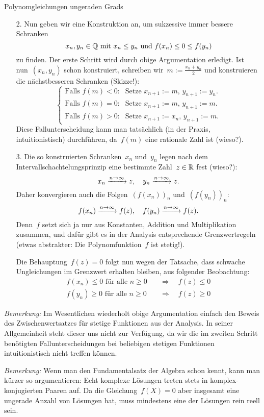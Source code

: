 \documentclass{algblatt}
\begin{document}
\begin{aufgabe}{Polynomgleichungen ungeraden Grads}
\begin{loesung}
\begin{enumerate}
\item[2.] Nun geben wir eine Konstruktion an, um sukzessive immer bessere
Schranken
\[ x_n, y_n \in \mathbb{Q} \text{ mit } x_n \leq y_n \text{ und } f(x_n) \leq 0 \leq
f(y_n) \]
zu finden. Der erste Schritt wird durch obige Argumentation erledigt. Ist
nun~$(x_n,y_n)$ schon konstruiert, schreiben wir~$m := \frac{x_n + y_n}{2}$
und konstruieren die nächstbesseren Schranken (Skizze!):
\[ \begin{cases}
  \text{Falls~$f(m) < 0$:} &
    \text{Setze $x_{n+1} := m$, $y_{n+1} := y_n$.} \\
  \text{Falls~$f(m) = 0$:} &
    \text{Setze $x_{n+1} := m$, $y_{n+1} := m$.} \\
  \text{Falls~$f(m) > 0$:} &
    \text{Setze $x_{n+1} := x_n$, $y_{n+1} := m$.}
\end{cases} \]
Diese Fallunterscheidung kann man tatsächlich (in der Praxis, intuitionistisch)
durchführen, da~$f(m)$ eine rationale Zahl ist (wieso?).
\item[3.] Die so konstruierten Schranken~$x_n$ und~$y_n$ legen nach dem
Intervallschachtelungsprinzip eine bestimmte Zahl~$z \in \mathbb{R}$ fest (wieso?):
\[ x_n \xrightarrow{n \to \infty} z, \quad y_n \xrightarrow{n \to \infty} z. \]
Daher konvergieren auch die Folgen~$(f(x_n))_n$ und~$(f(y_n))_n$:
\[ f(x_n) \xrightarrow{n \to \infty} f(z), \quad f(y_n) \xrightarrow{n \to \infty} f(z). \]
Denn~$f$ setzt sich ja nur aus Konstanten, Addition und Multiplikation
zusammen, und dafür gibt es in der Analysis entsprechende Grenzwertregeln
(etwas abstrakter: Die Polynomfunktion~$f$ ist stetig!).

Die Behauptung~$f(z) = 0$ folgt nun wegen der Tatsache, dass schwache
Ungleichungen im Grenzwert erhalten bleiben, aus folgender Beobachtung:
\begin{align*}
  \text{$f(x_n) \leq 0$ für alle~$n \geq 0$} &\quad\Longrightarrow\quad f(z) \leq 0 \\
  \text{$f(y_n) \geq 0$ für alle~$n \geq 0$} &\quad\Longrightarrow\quad f(z) \geq 0
\end{align*}
\end{enumerate}

\emph{Bemerkung:} Im Wesentlichen wiederholt obige Argumentation einfach den
Beweis des Zwischenwertsatzes für stetige Funktionen aus der Analysis. In
seiner Allgemeinheit steht dieser uns nicht zur Verfügung, da wir die im
zweiten Schritt benötigten Fallunterscheidungen bei beliebigen stetigen
Funktionen intuitionistisch nicht treffen können.

\emph{Bemerkung:} Wenn man den Fundamentalsatz der Algebra schon kennt, kann
man kürzer so argumentieren: Echt komplexe Lösungen treten stets in
komplex-konjugierten Paaren auf. Da die Gleichung~$f(X) = 0$ aber insgesamt
eine ungerade Anzahl von Lösungen hat, muss mindestens eine der Lösungen rein
reell sein.
\end{loesung}
\end{aufgabe}
\end{document}
